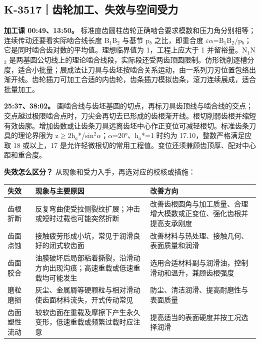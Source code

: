 \documentclass[zihao=5,a4paper,UTF8,fontset=fandol]{ctexart}
\begin{document}
\subsection{K-3517｜齿轮加工、失效与空间受力}
\label{k-3517}

\textbf{加工课 00:49、13:50。} 标准直齿圆柱齿轮正确啮合要求模数和压力角分别相等；连续传动还要看实际啮合线长度 B$_{1}$B$_{2}$ 与基节 p$_{b}$ 之比，即重合度 $\varepsilon$$\alpha$=B$_{1}$B$_{2}$/p$_{b}$；它是同时啮合齿对数的平均值。理想临界值为 1，工程上应大于 1 并留裕量。N$_{1}$N$_{2}$ 是两基圆公切线上的理论啮合线段，实际段还受两齿顶圆限制。仿形铣削逐槽分度，适合小批量；展成法让刀具与齿坯按啮合关系运动，由一系列刀刃位置包络出渐开线。齿轮插刀可加工合适的内齿轮，齿条插刀模拟齿条，滚刀连续展成，适合批量加工。


\textbf{25:37、38:02。} 画啮合线与齿坯基圆的切点，再标刀具齿顶线与啮合线的交点；交点越过极限啮合点时，刀尖会再切去已形成的齿根渐开线。根切削弱齿根并缩短有效齿廓。增加齿数或让齿条刀具远离齿坯中心作正变位可减轻根切。标准齿条刀具的理论界限为 z$\ge$2h$_{a}$*/sin$^{2}$$\alpha$；$\alpha$=20°、h$_{a}$*=1 时约为 17.10，整数严格满足应取 18 或以上，17 是允许轻微根切的常用工程值。变位还须兼顾齿顶厚、配对中心距和重合度。




\textbf{失效怎么区分？} 从现象和受力入手，再选对应的校核或措施：


\begin{longtable}{p{4.86cm}p{4.86cm}p{4.86cm}}
\toprule
失效 & 现象与主要原因 & 改善方向 \\

\midrule
\endhead
齿根折断 & 反复弯曲使受拉侧裂纹扩展；冲击或短时过载也可能突然折断 & 改善齿根圆角与加工质量、合理增大模数或正变位、强化齿根并提高支承刚度 \\
齿面点蚀 & 接触疲劳形成小坑，常见于润滑良好的闭式软齿面 & 改善材料与热处理、接触几何、表面质量和润滑 \\
齿面胶合 & 油膜破坏后局部粘着撕裂，沿滑动方向出现沟痕；高速重载或低速重载均可能发生 & 选用合适材料副与润滑油，控制滑动和温升，兼顾齿根强度 \\
磨粒磨损 & 灰尘、金属屑等硬颗粒与相对滑动使齿面材料流失，开式传动常见 & 防尘、清洁润滑、提高耐磨性与表面质量 \\
齿面塑性流动 & 较软齿面在重载及摩擦下产生永久变形，低速重载或频繁过载时应注意 & 提高适当的表面硬度并按工况选择润滑 \\
\bottomrule
\end{longtable}
\end{document}
